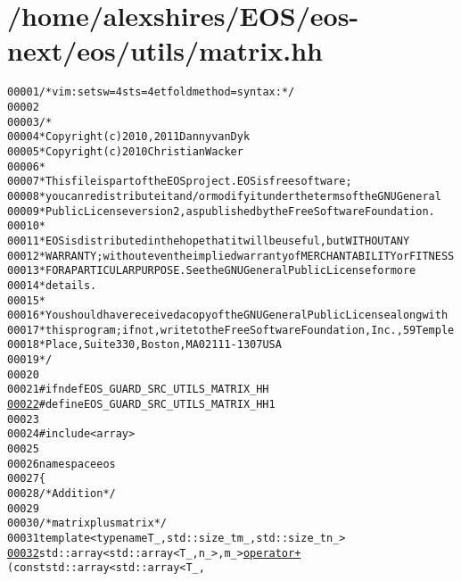 \hypertarget{matrix_8hh_source}{
\section{/home/alexshires/EOS/eos-\/next/eos/utils/matrix.hh}
}


\begin{footnotesize}\begin{alltt}
00001 \textcolor{comment}{/* vim: set sw=4 sts=4 et foldmethod=syntax : */}
00002 
00003 \textcolor{comment}{/*}
00004 \textcolor{comment}{ * Copyright (c) 2010, 2011 Danny van Dyk}
00005 \textcolor{comment}{ * Copyright (c) 2010 Christian Wacker}
00006 \textcolor{comment}{ *}
00007 \textcolor{comment}{ * This file is part of the EOS project. EOS is free software;}
00008 \textcolor{comment}{ * you can redistribute it and/or modify it under the terms of the GNU General}
00009 \textcolor{comment}{ * Public License version 2, as published by the Free Software Foundation.}
00010 \textcolor{comment}{ *}
00011 \textcolor{comment}{ * EOS is distributed in the hope that it will be useful, but WITHOUT ANY}
00012 \textcolor{comment}{ * WARRANTY; without even the implied warranty of MERCHANTABILITY or FITNESS}
00013 \textcolor{comment}{ * FOR A PARTICULAR PURPOSE.  See the GNU General Public License for more}
00014 \textcolor{comment}{ * details.}
00015 \textcolor{comment}{ *}
00016 \textcolor{comment}{ * You should have received a copy of the GNU General Public License along with}
00017 \textcolor{comment}{ * this program; if not, write to the Free Software Foundation, Inc., 59 Temple}
00018 \textcolor{comment}{ * Place, Suite 330, Boston, MA  02111-1307  USA}
00019 \textcolor{comment}{ */}
00020 
00021 \textcolor{preprocessor}{#ifndef EOS\_GUARD\_SRC\_UTILS\_MATRIX\_HH}
\hypertarget{matrix_8hh_source_l00022}{}\hyperlink{matrix_8hh_ad2e12ccc63e8b682bb3a09a7a9d97499}{00022} \textcolor{preprocessor}{}\textcolor{preprocessor}{#define EOS\_GUARD\_SRC\_UTILS\_MATRIX\_HH 1}
00023 \textcolor{preprocessor}{}
00024 \textcolor{preprocessor}{#include <array>}
00025 
00026 \textcolor{keyword}{namespace }eos
00027 \{
00028     \textcolor{comment}{/* Addition */}
00029 
00030     \textcolor{comment}{/* matrix plus matrix */}
00031     \textcolor{keyword}{template} <\textcolor{keyword}{typename} T\_, std::\textcolor{keywordtype}{size\_t} m\_, std::\textcolor{keywordtype}{size\_t} n\_>
\hypertarget{matrix_8hh_source_l00032}{}\hyperlink{namespaceeos_a0e3f5e761fbf126d8fcda142fed73318}{00032}     std::array<std::array<T\_, n\_>, m\_> \hyperlink{namespaceeos_a0e3f5e761fbf126d8fcda142fed73318}{operator+ }(\textcolor{keyword}{const} std::array<std::array<T\_,

\end{alltt}
\end{footnotesize}
